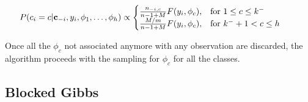 \begin{displaymath}
		            	\hspace{-20pt}
		            	P(c_{i}=c | \mathbf c_{-i}, y_{i}, \phi_{1},\dots,\phi_{h}) \propto \begin{cases}  \frac{n_{-i,c}}{n-1+M}F(y_{i},\phi_{c}), & \mbox{for } 1 \leq c \leq k^{-} \\ \frac{M/m}{n-1+M}F(y_{i},\phi_{c}), & \mbox{for } k^{-}+1 < c \leq h
		            	\end{cases}
		            	\vspace{-5pt}
		            	\end{displaymath}

Once all the $\phi_c$ not associated anymore with any observation are discarded, the algorithm proceeds with the sampling for $\phi_c$ for all the classes.


\subsection{Blocked Gibbs}
